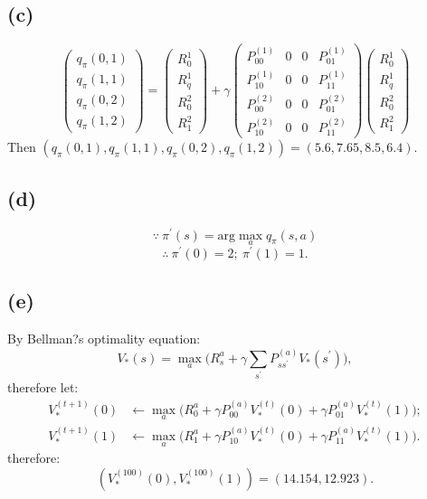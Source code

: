 \documentclass[12pt]{article}
\begin{document}
\subsection*{(c)}
\begin{equation}
\left(                     
\begin{matrix}
q_{\pi}(0,1) \\  q_{\pi}(1,1) \\  q_{\pi}(0,2) \\  q_{\pi}(1,2)
\end{matrix}
\right) =
\left(                     
\begin{matrix}
R_0^1 \\ R_q^1 \\ R_0^2 \\ R_1^2 
\end{matrix}
\right)  + \gamma
\left(                     
\begin{matrix}
P_{00}^{(1)} & 0 & 0 & P_{01}^{(1)} \\
P_{10}^{(1)} & 0 & 0 & P_{11}^{(1)} \\
P_{00}^{(2)} & 0 & 0 & P_{01}^{(2)} \\
P_{10}^{(2)} & 0 & 0 & P_{11}^{(2)} 
\end{matrix}
\right) 
\left(                     
\begin{matrix}
R_0^1 \\ R_q^1 \\ R_0^2 \\ R_1^2 
\end{matrix}
\right) 
\end{equation}
Then $(q_{\pi}(0,1),  q_{\pi}(1,1),  q_{\pi}(0,2),  q_{\pi}(1,2) ) = (5.6, 7.65, 8.5, 6.4)$.


\subsection*{(d)}

$$\because \ \pi^{'}(s) = \mathrm{arg} \max_{a} q_{\pi}(s, a)$$
$$\therefore \ \pi^{'}(0) = 2; \ \pi^{'}(1) = 1. $$

\subsection*{(e)}

By Bellman?s optimality equation: $$V_{*}(s) = \max_{a} \bigg(R_s^a + \gamma \sum_{s^{'}}  P_{s s^{'}}^{(a)} V_{*}(s^{'}) \bigg),$$
therefore let:
\begin{align*}
V_{*}^{(t+1)}(0) &\leftarrow \max_a \bigg(  R_0^a + \gamma P_{00}^{(a)} V_{*}^{(t)}(0) +   \gamma P_{01}^{(a)} V_{*}^{(t)}(1)  \bigg) ; \\
V_{*}^{(t+1)}(1) &\leftarrow \max_a \bigg(  R_1^a + \gamma P_{10}^{(a)} V_{*}^{(t)}(0) +   \gamma P_{11}^{(a)} V_{*}^{(t)}(1)  \bigg).
\end{align*}
therefore:
$$ (V_{*}^{(100)}(0), V_{*}^{(100)}(1)) = (14.154,  12.923). $$
\end{document}
